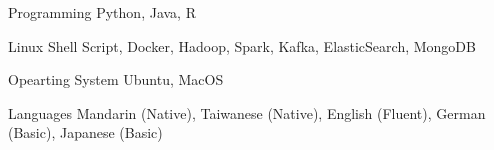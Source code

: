 


\begin{cvskills}


\cvskill
{Programming} %
{Python, Java, R} %


\cvskill
{Linux} %
{Shell Script, Docker, Hadoop, Spark, Kafka, ElasticSearch, MongoDB} %



\cvskill
{Opearting System} %
{Ubuntu, MacOS} %


\cvskill
{Languages} %
{Mandarin (Native), Taiwanese (Native), English (Fluent), German (Basic), Japanese (Basic)} %


\end{cvskills}